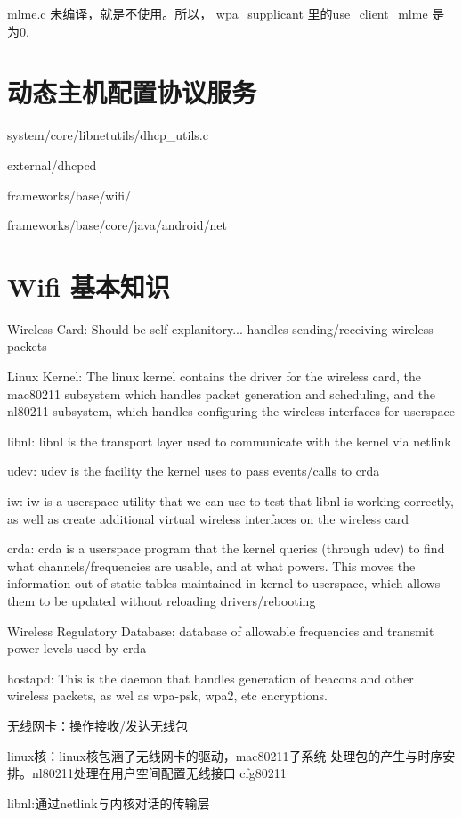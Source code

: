 \documentclass[a4paper,11pt,]{article}%
\begin{document}
mlme.c 未编译，就是不使用。所以， wpa_supplicant 里的use_client_mlme 是为0.


\section{动态主机配置协议服务}

system/core/libnetutils/dhcp_utils.c

external/dhcpcd


frameworks/base/wifi/

frameworks/base/core/java/android/net

\section{Wifi 基本知识}

Wireless Card: Should be self explanitory... handles sending/receiving wireless packets

Linux Kernel: The linux kernel contains the driver for the wireless card, the
mac80211 subsystem which handles packet generation and scheduling, and the
nl80211 subsystem, which handles configuring the wireless interfaces for
userspace

libnl: libnl is the transport layer used to communicate with the kernel via netlink

udev: udev is the facility the kernel uses to pass events/calls to crda

iw: iw is a userspace utility that we can use to test that libnl is working
correctly, as well as create additional virtual wireless interfaces on the
wireless card

crda: crda is a userspace program that the kernel queries (through udev) to
find what channels/frequencies are usable, and at what powers. This moves the
information out of static tables maintained in kernel to userspace, which
allows them to be updated without reloading drivers/rebooting

Wireless Regulatory Database: database of allowable frequencies and transmit
power levels used by crda

hostapd: This is the daemon that handles generation of beacons and other
wireless packets, as wel as wpa-psk, wpa2, etc encryptions.

无线网卡：操作接收/发达无线包

linux核：linux核包涵了无线网卡的驱动，mac80211子系统 处理包的产生与时序安排。nl80211处理在用户空间配置无线接口  cfg80211 

libnl:通过netlink与内核对话的传输层
\end{document}
